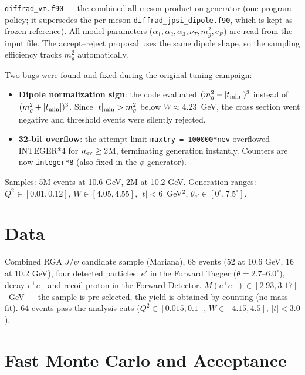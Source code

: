 \documentclass[12pt,a4paper]{article}
\begin{document}
\texttt{diffrad\_vm.f90} --- the combined all-meson production generator
(one-program policy; it supersedes the per-meson
\texttt{diffrad\_jpsi\_dipole.f90}, which is kept as frozen reference).
All model parameters ($\alpha_1,\alpha_2,\alpha_3,\nu_T,m_g^2,c_R$)
are read from the input file. The accept--reject proposal uses the same dipole
shape, so the sampling efficiency tracks $m_g^2$ automatically.

Two bugs were found and fixed during the original tuning campaign:
\begin{itemize}
\item \textbf{Dipole normalization sign}: the code evaluated
$(m_g^2 - |t_{\rm min}|)^3$ instead of $(m_g^2 + |t_{\rm min}|)^3$.
Since $|t|_{\rm min} > m_g^2$ below $W \approx 4.23$~GeV, the cross
section went negative and threshold events were silently rejected.
\item \textbf{32-bit overflow}: the attempt limit \texttt{maxtry = 100000*nev}
overflowed INTEGER*4 for $n_{\rm ev} \geq 2$M, terminating generation
instantly. Counters are now \texttt{integer*8} (also fixed in the $\phi$
generator).
\end{itemize}

Samples: 5M events at 10.6 GeV, 2M at 10.2 GeV.
Generation ranges: $Q^2 \in [0.01, 0.12]$, $W \in [4.05, 4.55]$,
$|t| < 6$~GeV$^2$, $\theta_{e'} \in [0^\circ, 7.5^\circ]$.

\section{Data}

Combined RGA $J/\psi$ candidate sample (Mariana), 68 events
(52 at 10.6 GeV, 16 at 10.2 GeV), four detected particles:
$e'$ in the Forward Tagger ($\theta = 2.7$--$6.0^\circ$),
decay $e^+e^-$ and recoil proton in the Forward Detector.
$M(e^+e^-) \in [2.93, 3.17]$~GeV --- the sample is pre-selected, the yield
is obtained by counting (no mass fit). 64 events pass the analysis cuts
($Q^2 \in [0.015, 0.1]$,
$W \in [4.15, 4.5]$, $|t| < 3.0$).

\section{Fast Monte Carlo and Acceptance}
\end{document}
